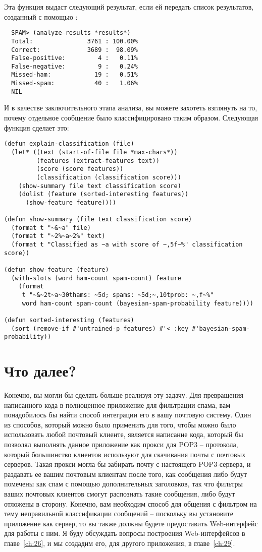 Эта функция выдаст следующий результат, если ей передать список результатов, созданный с
помощью :

\begin{verbatim}
  SPAM> (analyze-results *results*)
  Total:               3761 : 100.00%
  Correct:             3689 :  98.09%
  False-positive:         4 :   0.11%
  False-negative:         9 :   0.24%
  Missed-ham:            19 :   0.51%
  Missed-spam:           40 :   1.06%
  NIL
\end{verbatim}

И в качестве заключительного этапа анализа, вы можете захотеть взглянуть на то, почему
отдельное сообщение было классифицировано таким образом.  Следующая функция сделает это:

\begin{lstlisting}
(defun explain-classification (file)
  (let* ((text (start-of-file file *max-chars*))
         (features (extract-features text))
         (score (score features))
         (classification (classification score)))
    (show-summary file text classification score)
    (dolist (feature (sorted-interesting features))
      (show-feature feature))))

(defun show-summary (file text classification score)
  (format t "~&~a" file)
  (format t "~2%~a~2%" text)
  (format t "Classified as ~a with score of ~,5f~%" classification score))

(defun show-feature (feature)
  (with-slots (word ham-count spam-count) feature
    (format
     t "~&~2t~a~30thams: ~5d; spams: ~5d;~,10tprob: ~,f~%"
     word ham-count spam-count (bayesian-spam-probability feature))))

(defun sorted-interesting (features)
  (sort (remove-if #'untrained-p features) #'< :key #'bayesian-spam-probability))
\end{lstlisting}

\section{Что далее?}

Конечно, вы могли бы сделать больше реализуя эту задачу.  Для превращения написанного кода
в полноценное приложение для фильтрации спама, вам понадобилось бы найти способ интеграции
его в вашу почтовую систему.  Один из способов, который можно было применить для того,
чтобы можно было использовать любой почтовый клиенте, является написание кода, который бы
позволял выполнять данное приложение как прокси для POP3 -- протокола, который большинство
клиентов используют для скачивания почты с почтовых серверов.  Такая прокси могла бы
забирать почту с настоящего POP3-сервера, и раздавать ее вашим почтовым клиентам после
того, как сообщения либо будут помечены как спам с помощью дополнительных заголовков, так
что фильтры ваших почтовых клиентов смогут распознать такие сообщения, либо будут отложены
в сторону.  Конечно, вам необходим способ для общения с фильтром на тему неправильной
классификации сообщений -- поскольку вы установите приложение как сервер, то вы также
должны будете предоставить Web-интерфейс для работы с ним.  Я буду обсуждать вопросы
построения Web-интерфейсов в главе~\ref{ch:26}, и мы создадим его, для другого приложения,
в главе~\ref{ch:29}.

